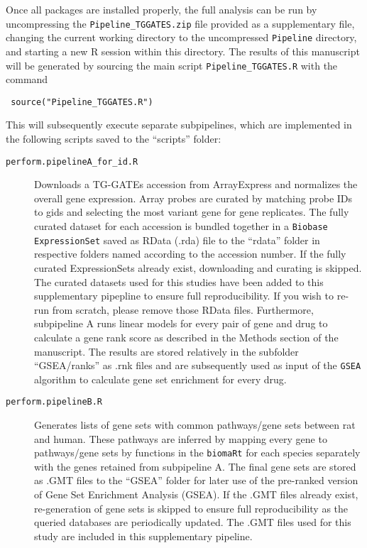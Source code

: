 \documentclass[a4paper,10pt]{scrartcl}
\begin{document}
Once all packages are installed properly, the full analysis can be run by uncompressing the \verb+Pipeline_TGGATES.zip+ file provided as a supplementary file, changing the current working directory to the uncompressed \verb+Pipeline+ directory, and starting a new R session within this directory. The results of this manuscript will be generated by sourcing the main script \verb+Pipeline_TGGATES.R+ with the command

\begin{verbatim}
 source("Pipeline_TGGATES.R")
\end{verbatim}

This will subsequently execute separate subpipelines, which are implemented in the following scripts saved to the ``scripts'' folder:

\begin{description}
 \item[\texttt{perform.pipelineA\_for\_id.R}] Downloads a TG-GATEs accession from ArrayExpress and normalizes the overall gene expression. Array probes are curated by matching probe IDs to gids and selecting the most variant gene for gene replicates. The fully curated dataset for each accession is bundled together in a \verb+Biobase ExpressionSet+ saved as RData (.rda) file to the ``rdata'' folder in respective folders named according to the accession number. If the fully curated ExpressionSets already exist, downloading and curating is skipped. The curated datasets used for this studies have been added to this supplementary pipepline to ensure full reproducibility. If you wish to re-run from scratch, please remove those RData files. Furthermore, subpipeline A runs linear models for every pair of gene and drug to calculate a gene rank score as described in the Methods section of the manuscript. The results are stored relatively in the subfolder ``GSEA/ranks'' as .rnk files and are subsequently used as input 
of the \verb+GSEA+ algorithm to calculate gene set enrichment for every drug.
 \item[\texttt{perform.pipelineB.R}] Generates lists of gene sets with common pathways/gene sets between rat and human. These pathways are inferred by mapping every gene to pathways/gene sets by functions in the \verb+biomaRt+ for each species separately with the genes retained from subpipeline A. The final gene sets are stored as .GMT files to the ``GSEA'' folder for later use of the pre-ranked version of Gene Set Enrichment Analysis (GSEA). If the .GMT files already exist, re-generation of gene sets is skipped to ensure full reproducibility as the queried databases are periodically updated. The .GMT files used for this study are included in this supplementary pipeline. 

\end{description}
\end{document}

